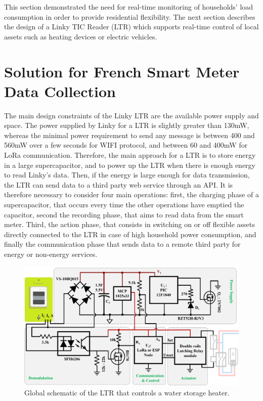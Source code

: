 \documentclass[conference]{IEEEtran}
\begin{document}
This section demonstrated the need for real-time monitoring of households' load consumption in order to provide residential flexibility.
  The next section describes the design of a Linky TIC Reader (LTR) which supports real-time control of local assets such as heating devices or electric vehicles.


\section{Solution for French Smart Meter Data Collection}
\label{section:solution}
The main design constraints of the Linky LTR are the available power supply and space.
 The power supplied by Linky for a LTR is slightly greater than 130mW, whereas the minimal power requirement to send any message is between 400 and 560mW over a few seconds for WIFI protocol, and between 60 and 400mW for LoRa communication. Therefore, the main approach for a LTR is to store energy in a large supercapacitor, and to power up the LTR when there is enough energy to read Linky's data. Then, if the energy is large enough for data transmission, the LTR can send data to a third party web service through an API. It is therefore necessary to consider four main operations: first, the charging phase of a supercapacitor, that occurs every time the other operations have emptied the capacitor, second the recording phase, that aims to read data from the smart meter. Third, the action phase, that consists in switching on or off flexible assets directly connected to the LTR in case of high household power consumption, and finally the communication phase that sends data to a remote third party for energy or non-energy services. 

\begin{figure}[h]
	\centering
	\includegraphics[width=1\columnwidth]{Images/Schematic.png}
	\caption{Global schematic of the LTR that controls a water storage heater.}
	\label{Fig:schematic}
\end{figure}
\end{document}
